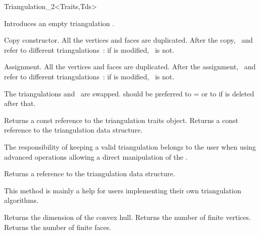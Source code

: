 \begin{ccRefClass}{Triangulation_2<Traits,Tds>}
\ccCreation
{}  %



\ccThreeToTwo
{}
\ccGlue
{}
{Introduces an empty triangulation \ccVar.}


{Copy constructor. All the vertices and faces are duplicated.
 After the copy, \ccVar\ and 
refer to different triangulations~: 
 if  is modified, \ccVar\ is not. }

{Assignment. All the vertices and faces are duplicated.
 After the assignment, \ccVar\ and 
refer to different triangulations~: 
 if  is modified, \ccVar\ is not.}

{The triangulations  and \ccVar\ are swapped.
 should be preferred to  =  or to
 if  is deleted after that.}




\ccAccessFunctions
{}
{Returns a const reference to the triangulation traits object.}
\ccGlue
{}
{Returns a const reference to the triangulation data structure.}

\begin{ccAdvanced}
The responsibility of keeping a valid triangulation belongs to the user
when using advanced operations allowing a direct manipulation of the .

{Returns a reference to the triangulation data structure.}

This method is mainly a help for users implementing their own triangulation
algorithms.
 
\end{ccAdvanced}


\ccGlue
{}
{Returns the dimension of the convex hull.}
\ccGlue
{}
{Returns the number of finite vertices.}
\ccGlue
{}
{Returns the number of finite faces.}


\end{ccRefClass}
